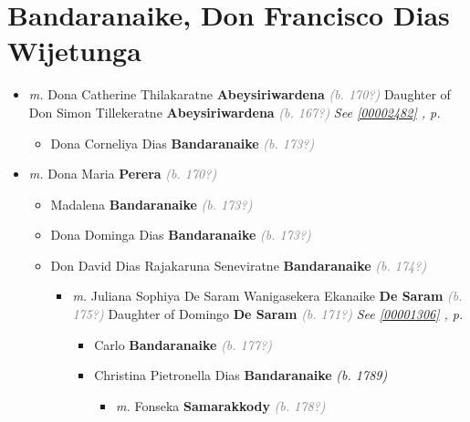 \documentclass[10pt, openany]{book}
\begin{document}
\chapter{Bandaranaike, Don Francisco Dias Wijetunga}
\label{00001285}
\textcolor{slmaroon}{\textit{}}
\begin{itemize}
\item{\textit{m.} Dona Catherine Thilakaratne \textbf{Abeysiriwardena} \textcolor{gray}{\textit{(b. 170?)}} Daughter of  Don Simon Tillekeratne \textbf{Abeysiriwardena} \textcolor{gray}{\textit{(b. 167?)}} \textcolor{slteal}{\textit{See  \autoref{00002482} \textit{, p. \pageref{00002482} }}}   \label{couple:00001285:00002481} \begin{itemize}
\item{Dona Corneliya Dias \textbf{Bandaranaike} \textcolor{gray}{\textit{(b. 173?)}}
   }
\end{itemize}}
\item{\textit{m.} Dona Maria \textbf{Perera} \textcolor{gray}{\textit{(b. 170?)}}   \label{couple:00001285:00001286} \begin{itemize}
\item{Madalena \textbf{Bandaranaike} \textcolor{gray}{\textit{(b. 173?)}}
 }
\item{Dona Dominga Dias \textbf{Bandaranaike} \textcolor{gray}{\textit{(b. 173?)}}
   }
\item{Don David Dias Rajakaruna Seneviratne \textbf{Bandaranaike} \textcolor{gray}{\textit{(b. 174?)}}
\begin{itemize}
\item{\textit{m.} Juliana Sophiya De Saram Wanigasekera Ekanaike \textbf{De Saram} \textcolor{gray}{\textit{(b. 175?)}} Daughter of  Domingo \textbf{De Saram} \textcolor{gray}{\textit{(b. 171?)}} \textcolor{slteal}{\textit{See  \autoref{00001306} \textit{, p. \pageref{00001306} }}}   \label{couple:00001304:00001305} \begin{itemize}
\item{Carlo \textbf{Bandaranaike} \textcolor{gray}{\textit{(b. 177?)}}
 }
\item{Christina Pietronella Dias \textbf{Bandaranaike} \textcolor{slorange}{\textit{(b. 1789)}}
\begin{itemize}
\item{\textit{m.}  Fonseka \textbf{Samarakkody} \textcolor{gray}{\textit{(b. 178?)}}   \label{couple:00001308:00001309} \begin{itemize}

\end{itemize}}
\end{itemize}}
\end{itemize}}
\end{itemize}}
\end{itemize}}
\end{itemize}
\end{document}
